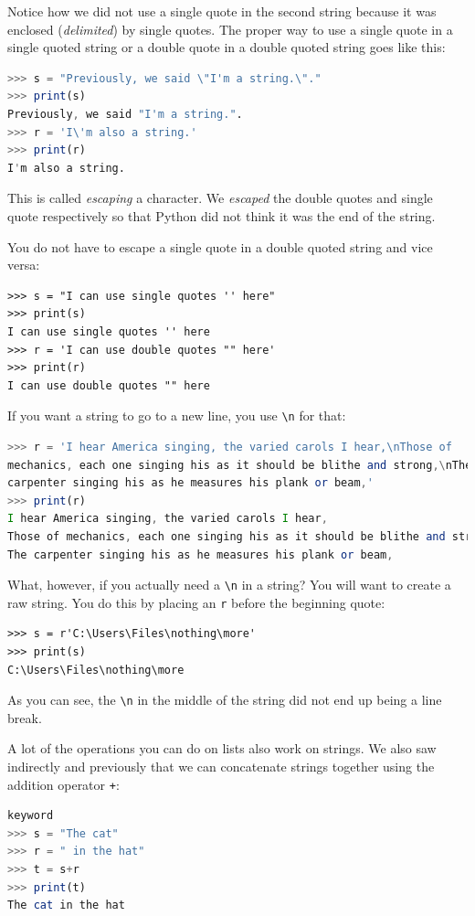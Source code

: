 \documentclass[11pt]{cselabheader}
\begin{document}
Notice how we did not use a single quote in the second string because it was
enclosed (\emph{delimited}) by single quotes. The proper way to use a single
quote in a single quoted string or a double quote in a double quoted string
goes like this:
\begin{lstlisting}[style=ipython,language=Octave]
>>> s = "Previously, we said \"I'm a string.\"."
>>> print(s)
Previously, we said "I'm a string.".
>>> r = 'I\'m also a string.'
>>> print(r)
I'm also a string.
\end{lstlisting}
This is called \emph{escaping} a character. We \emph{escaped} the double quotes
and single quote respectively so that Python did not think it was the end of
the string.

You do not have to escape a single quote in a double quoted string and vice
versa:
\begin{lstlisting}[style=ipython]
>>> s = "I can use single quotes '' here"
>>> print(s)
I can use single quotes '' here
>>> r = 'I can use double quotes "" here'
>>> print(r)
I can use double quotes "" here
\end{lstlisting}

If you want a string to go to a new line, you use \lstinline!\n! for that:
\begin{lstlisting}[style=ipython,language=Octave,caption={Excerpt of I Hear
America Singing by Walt Whitman}]
>>> r = 'I hear America singing, the varied carols I hear,\nThose of 
mechanics, each one singing his as it should be blithe and strong,\nThe 
carpenter singing his as he measures his plank or beam,'
>>> print(r)
I hear America singing, the varied carols I hear,
Those of mechanics, each one singing his as it should be blithe and strong,
The carpenter singing his as he measures his plank or beam,
\end{lstlisting}

What, however, if you actually need a \lstinline!\n! in a string? You will want
to create a raw string. You do this by placing an \lstinline!r! before the
beginning quote:
\begin{lstlisting}[style=ipython]
>>> s = r'C:\Users\Files\nothing\more'
>>> print(s)
C:\Users\Files\nothing\more
\end{lstlisting}

As you can see, the \lstinline!\n! in the middle of the string did not end up
being a line break.

A lot of the operations you can do on lists also work on strings. We also saw
indirectly and previously that we can concatenate strings together using the
addition operator \lstinline!+!:
\begin{lstlisting}[style=ipython,language=Octave] % octave doesn't have in
keyword
>>> s = "The cat"
>>> r = " in the hat"
>>> t = s+r
>>> print(t)
The cat in the hat
\end{lstlisting}
\end{document}
